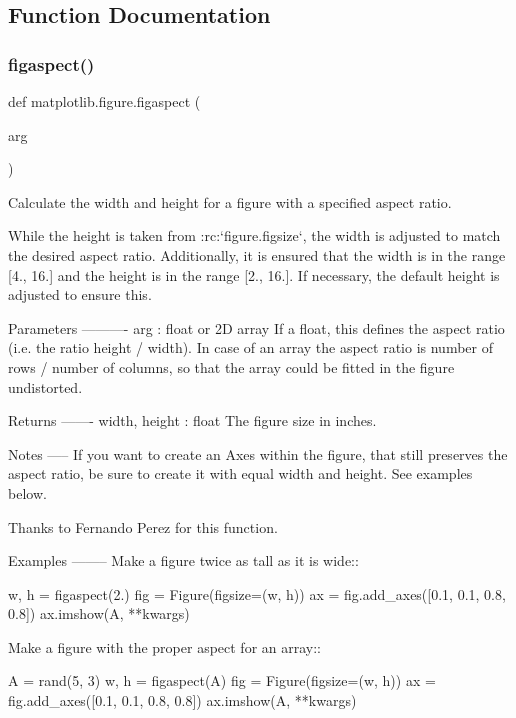 \subsection{Function Documentation}
\mbox{\label{namespacematplotlib_1_1figure_a5efc30798fd5c25c106bb06e2e19cafd}} 
\subsubsection{\texorpdfstring{figaspect()}{figaspect()}}
{\footnotesize\ttfamily def matplotlib.\+figure.\+figaspect (\begin{DoxyParamCaption}\item[{}]{arg }\end{DoxyParamCaption})}

\begin{DoxyVerb}Calculate the width and height for a figure with a specified aspect ratio.

While the height is taken from :rc:`figure.figsize`, the width is
adjusted to match the desired aspect ratio. Additionally, it is ensured
that the width is in the range [4., 16.] and the height is in the range
[2., 16.]. If necessary, the default height is adjusted to ensure this.

Parameters
----------
arg : float or 2D array
    If a float, this defines the aspect ratio (i.e. the ratio height /
    width).
    In case of an array the aspect ratio is number of rows / number of
    columns, so that the array could be fitted in the figure undistorted.

Returns
-------
width, height : float
    The figure size in inches.

Notes
-----
If you want to create an Axes within the figure, that still preserves the
aspect ratio, be sure to create it with equal width and height. See
examples below.

Thanks to Fernando Perez for this function.

Examples
--------
Make a figure twice as tall as it is wide::

    w, h = figaspect(2.)
    fig = Figure(figsize=(w, h))
    ax = fig.add_axes([0.1, 0.1, 0.8, 0.8])
    ax.imshow(A, **kwargs)

Make a figure with the proper aspect for an array::

    A = rand(5, 3)
    w, h = figaspect(A)
    fig = Figure(figsize=(w, h))
    ax = fig.add_axes([0.1, 0.1, 0.8, 0.8])
    ax.imshow(A, **kwargs)
\end{DoxyVerb}
 